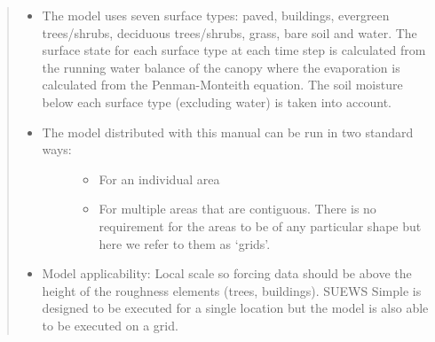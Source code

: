 \documentclass[letterpaper,10pt,english]{sphinxmanual}
\begin{document}
\begin{quote}
\begin{itemize}
\begin{description}
\begin{itemize}
\item {} 
The model uses seven surface types: paved, buildings, evergreen trees/shrubs, deciduous trees/shrubs, grass, bare soil and water. The surface state for each surface type at each time step is calculated from the running water balance of the canopy where the evaporation is calculated from the Penman-Monteith equation. The soil moisture below each surface type (excluding water) is taken into account.

\item {} \begin{description}
\item[{The model distributed with this manual can be run in two standard ways:}] \leavevmode\begin{itemize}
\item {} 
For an individual area

\item {} 
For multiple areas that are contiguous. There is no requirement for the areas to be of any particular shape but here we refer to them as ‘grids’.

\end{itemize}

\end{description}

\item {} 
Model applicability: Local scale \textendash{} so forcing data should be above the height of the roughness elements (trees, buildings). SUEWS Simple is designed to be executed for a single location but the model is also able to be executed on a grid.

\end{itemize}

\end{description}

\end{itemize}
\end{quote}
\end{document}
